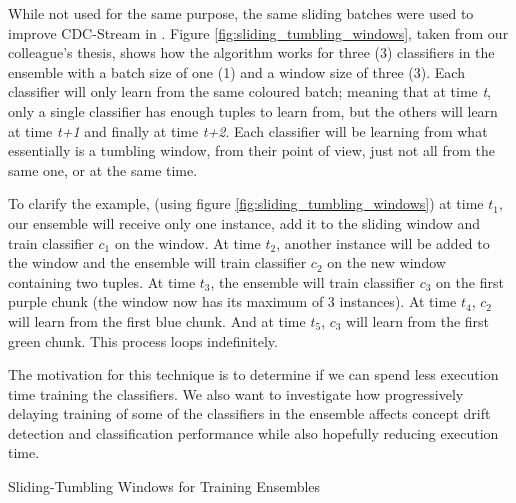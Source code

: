 While not used for the same purpose, the same sliding batches were used to improve CDC-Stream in \citep{d2016fine}. Figure \ref{fig:sliding_tumbling_windows}, taken from our colleague's thesis, shows how the algorithm works for three (3) classifiers in the ensemble with a batch size of one (1) and a window size of three (3). Each classifier will only learn from the same coloured batch; meaning that at time \textit{t}, only a single classifier has enough tuples to learn from, but the others will learn at time \textit{t+1} and finally at time \textit{t+2}. Each classifier will be learning from what essentially is a tumbling window, from their point of view, just not all from the same one, or at the same time. 

To clarify the example, (using figure \ref{fig:sliding_tumbling_windows}) at time $t_1$, our ensemble will receive only one instance, add it to the sliding window and train classifier $c_1$ on the window. At time $t_2$, another instance will be added to the window and the ensemble will train classifier $c_2$ on the new window containing two tuples. At time $t_3$, the ensemble will train classifier $c_3$ on the first purple chunk (the window now has its maximum of 3 instances). At time $t_4$, $c_2$ will learn from the first blue chunk. And at time $t_5$, $c_3$ will learn from the first green chunk. This process loops indefinitely. 

The motivation for this technique is to determine if we can spend less execution time training the classifiers. We also want to investigate how progressively delaying training of some of the classifiers in the ensemble affects concept drift detection and classification performance while also hopefully reducing execution time.

\begin{algorithm}
\caption{Sliding-Tumbling Windows for Training Ensembles\label{alg:sliding_tumbling_windows}}
\end{algorithm}

